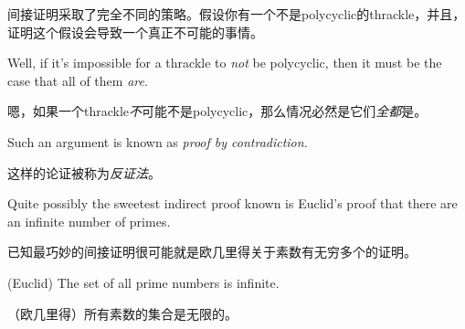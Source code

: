 间接证明采取了完全不同的策略。假设你有一个不是polycyclic的thrackle，并且，证明这个假设会导致一个真正不可能的事情。

Well, if it's impossible for a thrackle to {\em not} be
polycyclic, then it must be the case that all of them {\em are}.

嗯，如果一个thrackle{\em 不}可能不是polycyclic，那么情况必然是它们{\em 全都}是。

Such an argument is known as 
\emph{proof by contradiction}.

这样的论证被称为\emph{反证法}。

Quite possibly the sweetest indirect proof known is Euclid's proof that there
are an infinite number of primes.

已知最巧妙的间接证明很可能就是欧几里得关于素数有无穷多个的证明。

\begin{thm} (Euclid) The set of all prime numbers is infinite.

（欧几里得）所有素数的集合是无限的。
\end{thm}

